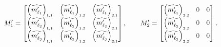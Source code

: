 \[ 
    M_1^\prime = 
      \begin{bmatrix}
        \left(\widehat{{ m}^\prime_{\ell_1}}\right)
            _{\mbox{\tiny 1,1}} &
        \left(\widehat{{ m}^\prime_{\ell_1}}\right)
            _{\mbox{\tiny 1,2}} & 
        \left(\widehat{{ m}^\prime_{\ell_1}}\right)
            _{\mbox{\tiny 2,1}} \\ 
        \left(\widehat{{ m}^\prime_{\ell_2}}\right)
            _{\mbox{\tiny 1,1}} & 
        \left(\widehat{{ m}^\prime_{\ell_2}}\right)
            _{\mbox{\tiny 1,2}} & 
        \left(\widehat{{ m}^\prime_{\ell_2}}\right)
            _{\mbox{\tiny 2,1}} \\
        \left(\widehat{{ m}^\prime_{\ell_3}}\right)
            _{\mbox{\tiny 1,1}} & 
        \left(\widehat{{ m}^\prime_{\ell_3}}\right)
            _{\mbox{\tiny 1,2}} & 
        \left(\widehat{{ m}^\prime_{\ell_3}}\right)
            _{\mbox{\tiny 2,1}} 
      \end{bmatrix}, \qquad
  M_2^\prime = 
      \begin{bmatrix}
        \left(\widehat{{ m}^\prime_{\ell_1}}\right)
            _{\mbox{\tiny 2,2}} & 0 & 0 \\
        \left(\widehat{{ m}^\prime_{\ell_2}}\right)
            _{\mbox{\tiny 2,2}} & 0 & 0 \\
        \left(\widehat{{ m}^\prime_{\ell_3}}\right)
            _{\mbox{\tiny 2,2}} & 0 & 0
      \end{bmatrix}.
\] 


